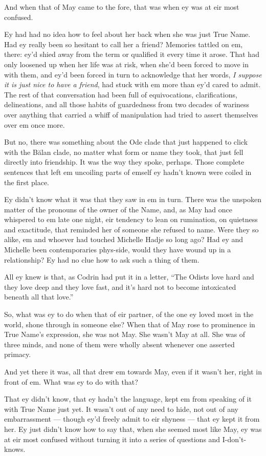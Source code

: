 And when that of May came to the fore, that was when ey was at eir most confused.

Ey had had no idea how to feel about her back when she was just True Name. Had ey really been so hesitant to call her a friend? Memories tattled on em, there: ey'd shied away from the term or qualified it every time it arose. That had only loosened up when her life was at risk, when she'd been forced to move in with them, and ey'd been forced in turn to acknowledge that her words, \emph{I suppose it is just nice to have a friend}, had stuck with em more than ey'd cared to admit. The rest of that conversation had been full of equivocations, clarifications, delineations, and all those habits of guardedness from two decades of wariness over anything that carried a whiff of manipulation had tried to assert themselves over em once more.

But no, there was something about the Ode clade that just happened to click with the Bălan clade, no matter what form or name they took, that just fell directly into friendship. It was the way they spoke, perhaps. Those complete sentences that left em uncoiling parts of emself ey hadn't known were coiled in the first place.

Ey didn't know what it was that they saw in em in turn. There was the unspoken matter of the pronouns of the owner of the Name, and, as May had once whispered to em late one night, eir tendency to lean on rumination, on quietness and exactitude, that reminded her of someone she refused to name. Were they so alike, em and whoever had touched Michelle Hadje so long ago? Had ey and Michelle been contemporaries phys-side, would they have wound up in a relationship? Ey had no clue how to ask such a thing of them.

All ey knew is that, as Codrin had put it in a letter, ``The Odists love hard and they love deep and they love fast, and it's hard not to become intoxicated beneath all that love.''

So, what was ey to do when that of eir partner, of the one ey loved most in the world, shone through in someone else? When that of May rose to prominence in True Name's expression, she was not May. She wasn't May at all. She was of three minds, and none of them were wholly absent whenever one asserted primacy.

And yet there it was, all that drew em towards May, even if it wasn't her, right in front of em. What was ey to do with that?

That ey didn't know, that ey hadn't the language, kept em from speaking of it with True Name just yet. It wasn't out of any need to hide, not out of any embarrassment — though ey'd freely admit to eir shyness — that ey kept it from her. Ey just didn't know how to say that, when she seemed most like May, ey was at eir most confused without turning it into a series of questions and I-don't-knows.

